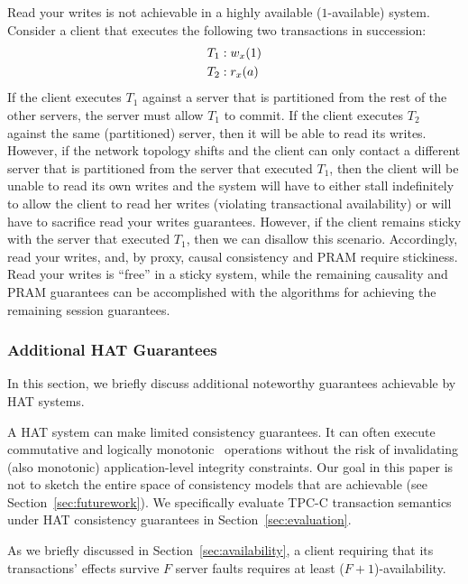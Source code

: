


Read your writes is not achievable in a highly available
($1$-available) system. Consider a client that executes the following
two transactions in succession:
\vspace{-.5em}
\begin{align*}
\small
T_1 &: w_x(1)
\\T_2 &: r_x(a)
\end{align*}
If the client executes $T_1$ against a server that is partitioned from
the rest of the other servers, the server must allow $T_1$ to
commit. If the client executes $T_2$ against the same (partitioned)
server, then it will be able to read its writes. However, if the
network topology shifts and the client can only contact a different
server that is partitioned from the server that executed $T_1$, then
the client will be unable to read its own writes and the system will
have to either stall indefinitely to allow the client to read her
writes (violating transactional availability) or will have to
sacrifice read your writes guarantees. However, if the client remains
sticky with the server that executed $T_1$, then we can disallow this
scenario. Accordingly, read your writes, and, by proxy, causal
consistency and PRAM require stickiness. Read your writes is ``free''
in a sticky system, while the remaining causality and PRAM guarantees
can be accomplished with the algorithms for achieving the remaining
session guarantees.

\subsubsection{Additional HAT Guarantees}

In this section, we briefly discuss additional noteworthy guarantees
achievable by HAT systems.

 A HAT system can make limited
consistency guarantees. It can often execute commutative and logically
monotonic~\cite{calm} operations without the risk of invalidating
(also monotonic) application-level integrity constraints. Our goal in
this paper is not to sketch the entire space of consistency models
that are achievable (see Section~\ref{sec:futurework}). We
specifically evaluate TPC-C transaction semantics under HAT
consistency guarantees in Section~\ref{sec:evaluation}.

\vspace{.5em} As we briefly discussed in
Section~\ref{sec:availability}, a client requiring that its
transactions' effects survive $F$ server faults requires at least
($F+1$)-availability.

